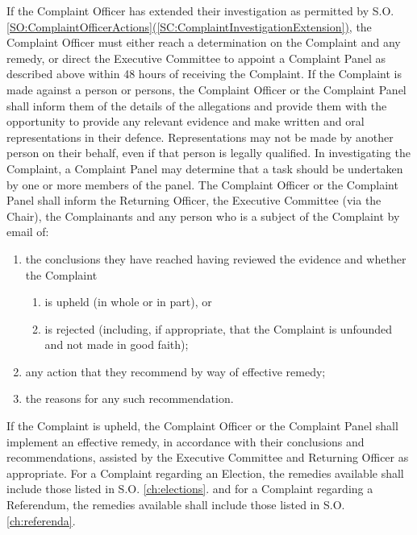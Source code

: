 \npara If the Complaint Officer has extended their investigation as permitted by S.O. \ref{SO:ComplaintOfficerActions}\hyperref[SC:ComplaintInvestigationExtension]{(\ref*{SC:ComplaintInvestigationExtension})}, the Complaint Officer must either reach a determination on the Complaint and any remedy, or direct the Executive Committee to appoint a Complaint Panel as described above within 48 hours of receiving the Complaint.
\npara If the Complaint is made against a person or persons, the Complaint Officer or the Complaint Panel shall inform them of the details of the allegations and provide them with the opportunity to provide any relevant evidence and make written and oral representations in their defence. Representations may not be made by another person on their behalf, even if that person is legally qualified.
\npara In investigating the Complaint, a Complaint Panel may determine that a task should be undertaken by one or more members of the panel.
\npara \label{SO:ComplaintOfficerInform} The Complaint Officer or the Complaint Panel shall inform the Returning Officer, the Executive Committee (via the Chair), the Complainants and any person who is a subject of the Complaint by email of:
\begin{enumerate}
\item the conclusions they have reached having reviewed the evidence and whether the Complaint
\begin{enumerate}
\item is upheld (in whole or in part), or
\item is rejected (including, if appropriate, that the Complaint is unfounded and not made in good faith);
\end{enumerate}
\item any action that they recommend by way of effective remedy;
\item the reasons for any such recommendation.
\end{enumerate}
\npara If the Complaint is upheld, the Complaint Officer or the Complaint Panel shall implement an effective remedy, in accordance with their conclusions and recommendations, assisted by the Executive Committee and Returning Officer as appropriate.  For a Complaint regarding an Election, the remedies available shall include those listed in S.O. \ref{ch:elections}. and for a Complaint regarding a Referendum, the remedies available shall include those listed in S.O. \ref{ch:referenda}.

